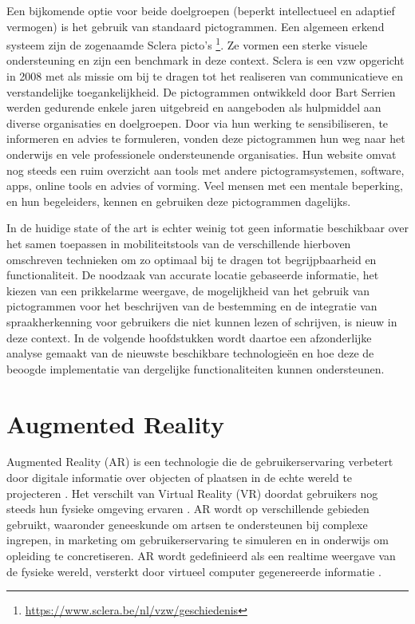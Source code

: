 Een bijkomende optie voor beide doelgroepen (beperkt intellectueel en adaptief vermogen) is het gebruik van standaard pictogrammen. Een algemeen erkend systeem zijn de zogenaamde Sclera picto's \footnote{\url{https://www.sclera.be/nl/vzw/geschiedenis}}. Ze vormen een sterke visuele ondersteuning en zijn een benchmark in deze context. Sclera is een vzw opgericht in 2008 met als missie om bij te dragen tot het realiseren van communicatieve en verstandelijke toegankelijkheid. De pictogrammen ontwikkeld door Bart Serrien werden gedurende enkele jaren uitgebreid en aangeboden als hulpmiddel aan diverse organisaties en doelgroepen. Door via hun werking te sensibiliseren, te informeren en advies te formuleren, vonden deze pictogrammen hun weg naar het onderwijs en vele professionele ondersteunende organisaties. Hun website omvat nog steeds een ruim overzicht aan tools met andere pictogramsystemen, software, apps, online tools en advies of vorming. Veel mensen met een mentale beperking, en hun begeleiders, kennen en gebruiken deze pictogrammen dagelijks. 

In de huidige state of the art is echter weinig tot geen informatie beschikbaar over het samen toepassen in mobiliteitstools van de verschillende hierboven omschreven technieken om zo optimaal bij te dragen tot begrijpbaarheid en functionaliteit. De noodzaak van accurate locatie gebaseerde informatie, het kiezen van een prikkelarme weergave, de mogelijkheid van het gebruik van pictogrammen voor het beschrijven van de bestemming en de integratie van spraakherkenning voor gebruikers die niet kunnen lezen of schrijven, is nieuw in deze context. In de volgende hoofdstukken wordt daartoe een afzonderlijke analyse gemaakt van de nieuwste beschikbare technologieën en hoe deze de beoogde implementatie van dergelijke functionaliteiten kunnen ondersteunen. 


\section{Augmented Reality}
\label{sec:augmented-reality}

Augmented Reality (AR) is een technologie die de gebruikerservaring verbetert door digitale informatie over objecten of plaatsen in de echte wereld te projecteren \autocite{Berryman2012}. Het verschilt van Virtual Reality (VR) doordat gebruikers nog steeds hun fysieke omgeving ervaren \autocite{Calo2015}. AR wordt op verschillende gebieden gebruikt, waaronder geneeskunde om artsen te ondersteunen bij complexe ingrepen, in marketing om gebruikerservaring te simuleren en in onderwijs om opleiding te concretiseren. AR wordt gedefinieerd als een realtime weergave van de fysieke wereld, versterkt door virtueel computer gegenereerde informatie \autocite{Carmigniani2011}. 

